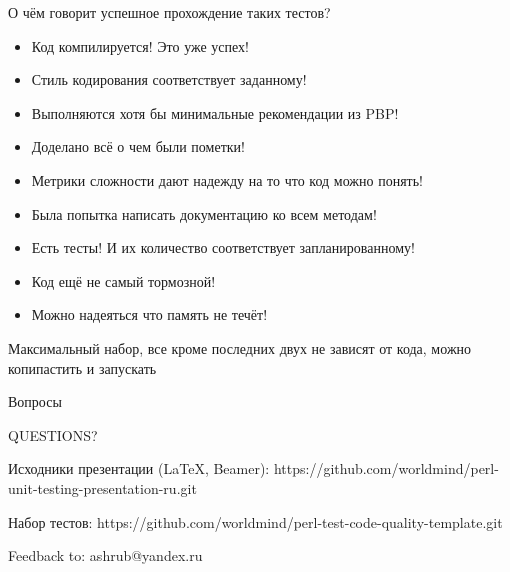 \documentclass[aspectratio=169]{beamer}
\begin{document}
\begin{frame}{О чём говорит успешное прохождение таких тестов?}
\begin{itemize}
\item Код компилируется! Это уже успех!
\item Стиль кодирования соответствует заданному!
\item Выполняются хотя бы минимальные рекомендации из PBP!
\item Доделано всё о чем были пометки!
\item Метрики сложности дают надежду на то что код можно понять!
\item Была попытка написать документацию ко всем методам!
\item Есть тесты! И их количество соответствует запланированному!
\item Код ещё не самый тормозной!
\item Можно надеяться что память не течёт!
\end{itemize}
\end{frame}

\begin{frame}{}
Максимальный набор, все кроме последних двух не зависят от кода, можно копипастить и запускать
\end{frame}

\begin{frame}{Вопросы}

\begin{center}
\LARGE QUESTIONS?
\end{center}

\begin{block}{Исходники презентации (LaTeX, Beamer):}
https://github.com/worldmind/perl-unit-testing-presentation-ru.git
\end{block}

\begin{block}{Набор тестов:}
https://github.com/worldmind/perl-test-code-quality-template.git
\end{block}

\begin{block}{Feedback to:}
ashrub@yandex.ru
\end{block}

\end{frame}
\end{document}
